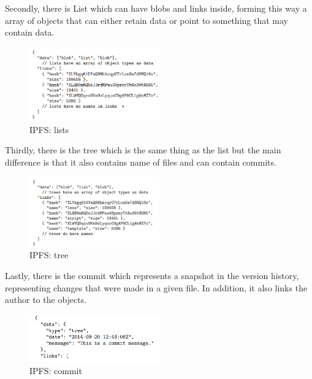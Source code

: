 Secondly, there is List which can have blobs and links inside, forming this way a array of objects that can either retain data or point to something that may contain data.

\begin{figure}[H]
    \centering
    \includegraphics[width=0.5\textwidth]{assets/use-case-1/List.png} %
    \caption{IPFS: lists}
    \label{fig:sample-image} 
\end{figure}


Thirdly, there is the tree which is the same thing as the list but the main difference is that it also contains name of files and can contain commits.

\begin{figure}[H]
    \centering
    \includegraphics[width=0.5\textwidth]{assets/use-case-1/Trees.png} %
    \caption{IPFS: tree}
    \label{fig:sample-image} 
\end{figure}


Lastly, there is the commit which represents a snapshot in the version history, representing changes that were made in a given file. In addition, it also links the author to the objects.

\begin{figure}[H]
    \centering
    \includegraphics[width=0.5\textwidth]{assets/use-case-1/commit.png} %
    \caption{IPFS: commit}
    \label{fig:sample-image} 
\end{figure}


